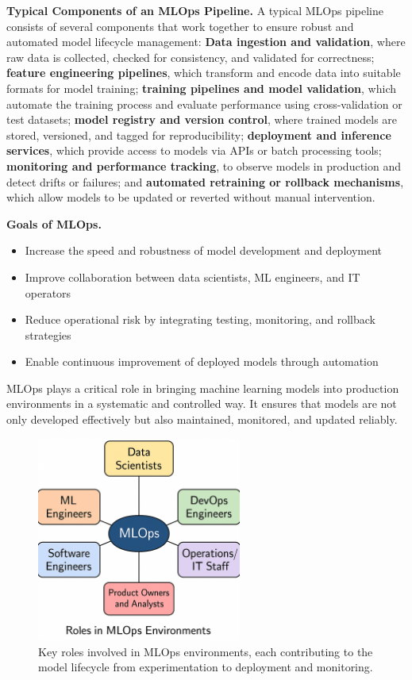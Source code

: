 {\bf Typical Components of an MLOps Pipeline.} A typical MLOps pipeline consists of several components that work together to ensure robust and automated model lifecycle management: 
\textbf{Data ingestion and validation}, where raw data is collected, checked for consistency, and validated for correctness; 
\textbf{feature engineering pipelines}, which transform and encode data into suitable formats for model training; 
\textbf{training pipelines and model validation}, which automate the training process and evaluate performance using cross-validation or test datasets; 
\textbf{model registry and version control}, where trained models are stored, versioned, and tagged for reproducibility; 
\textbf{deployment and inference services}, which provide access to models via APIs or batch processing tools; 
\textbf{monitoring and performance tracking}, to observe models in production and detect drifts or failures; and 
\textbf{automated retraining or rollback mechanisms}, which allow models to be updated or reverted without manual intervention.


{\bf Goals of MLOps.}
\begin{itemize}
	\item Increase the speed and robustness of model development and deployment
	\item Improve collaboration between data scientists, ML engineers, and IT operators
	\item Reduce operational risk by integrating testing, monitoring, and rollback strategies
	\item Enable continuous improvement of deployed models through automation
\end{itemize}

MLOps plays a critical role in bringing machine learning models into production environments in a systematic and controlled way. It ensures that models are not only developed effectively but also maintained, monitored, and updated reliably.

\begin{figure}[ht]
  \centering
  \includegraphics[width=0.6\textwidth]{images/mlops_roles.png}
  \caption{Key roles involved in MLOps environments, each contributing to the model lifecycle from experimentation to deployment and monitoring.}
  \label{fig:mlops-roles}
\end{figure}


